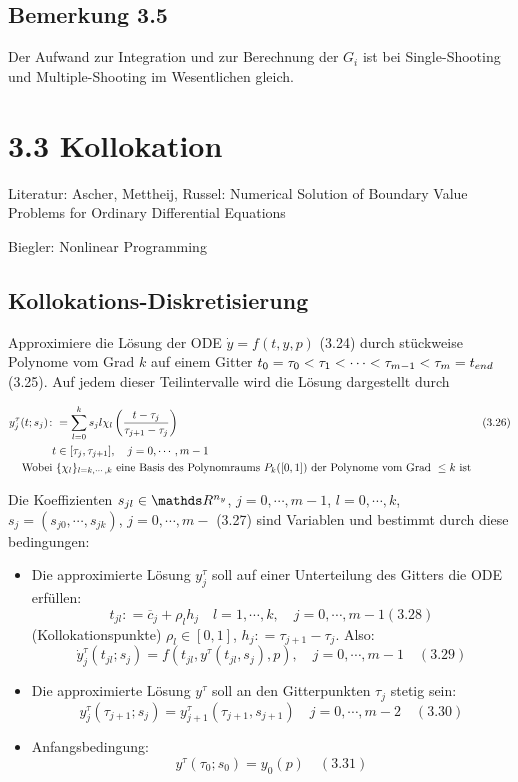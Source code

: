 \subsection*{Bemerkung 3.5}

Der Aufwand zur Integration und zur Berechnung der $G_i$ ist bei Single-Shooting und Multiple-Shooting im Wesentlichen gleich.

\section*{3.3 Kollokation}

Literatur: Ascher, Mettheij, Russel: Numerical Solution of Boundary Value Problems for Ordinary Differential Equations

Biegler: Nonlinear Programming

\subsection*{Kollokations-Diskretisierung}

Approximiere die Lösung der ODE $\dot y = f(t,y,p)$ (3.24) durch stückweise Polynome vom Grad $k$ auf einem Gitter $t_0 = \tau_0 < \tau_1 < \cdots < \tau_{m-1} < \tau_m = t_{end}$ (3.25). Auf jedem dieser Teilintervalle wird die Lösung dargestellt durch

\begin{align*}
y_j^\tau (t; s_j) \colon&= \sum\limits_{l=0}^k s_j l \chi_l \left( \frac{t-\tau_j}{\tau_{j+1}-\tau_j} \right) & (3.26)\\
t &\in [\tau_j, \tau_{j+1}], \quad j=0,\cdots,m-1 \\
\text{Wobei } & \{ \chi_l \}_{l=k,\cdots,k} \text{ eine Basis des Polynomraums } P_k([0,1]) \text{ der Polynome vom Grad } \leq k \text{ ist}
\end{align*}

Die Koeffizienten $s_{jl} \in \R^{n_y}$, $j=0,\cdots,m-1$, $l=0,\cdots,k$, $s_j = (s_{j0},\cdots,s_{jk})$, $j=0,\cdots,m-$ (3.27) sind Variablen und bestimmt durch diese bedingungen:

\begin{itemize}
\item Die approximierte Lösung $y_j^\tau$ soll auf einer Unterteilung des Gitters die ODE erfüllen:
\[ t_{jl} \colon= \overline c_j + \rho_l h_j \quad l= 1,\cdots,k, \quad j=0,\cdots,m-1 (3.28) \]
(Kollokationspunkte) $\rho_l \in [0,1]$, $h_j \colon= \tau_{j+1}-\tau_j$. Also:
\[ \dot y_j^\tau (t_{jl}; s_j) = f(t_{jl}, y^\tau (t_{jl},s_j),p), \quad j=0,\cdots,m-1 \quad (3.29) \]
\item Die approximierte Lösung $y^\tau$ soll an den Gitterpunkten $\tau_j$ stetig sein:
\[ y_j^\tau (\tau_{j+1};s_j) = y_{j+1}^\tau(\tau_{j+1},s_{j+1}) \quad j=0,\cdots,m-2 \quad (3.30) \]
\item Anfangsbedingung:
\[y^\tau(\tau_0;s_0) = y_0(p) \quad (3.31) \]
\end{itemize}

